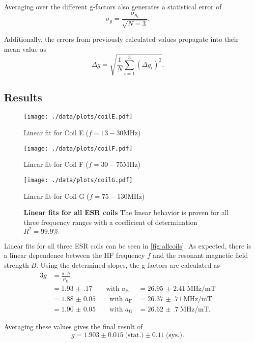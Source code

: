 Averaging over the different g-factors also generates a statistical error of
\begin{equation*}
	\sigma_g = \frac{\sigma_{g_i}}{\sqrt{N=3}}.
\end{equation*}

Additionally, the errors from previously calculated values propagate into their mean value as
\begin{equation*}
	\Delta g = \sqrt{\frac{1}{N}\sum_{i=1}^3 \left(\Delta g_i\right)^2}.
\end{equation*}

\subsection{Results}
\begin{figure}[!htb]
		\texttt{[image: ./data/plots/coilE.pdf]}
		\caption*{Linear fit for Coil E ($f=13-30\si{\MHz}$)}\label{fig:coilE}
	\endminipage\hfill
	\texttt{[image: ./data/plots/coilF.pdf]}
	\caption*{Linear fit for Coil F ($f=30-75\si{\MHz}$)}\label{fig:coilF}
	\endminipage\hfill\centering
	\texttt{[image: ./data/plots/coilG.pdf]}
	\caption*{Linear fit for Coil G ($f=75-130\si{\MHz}$)}\label{fig:coilG}
	\endminipage
	\caption[Linear fits for all ESR coils]{\textbf{Linear fits for all ESR coils} The linear behavior is proven for all three frequency ranges with a coefficient of determination $R^2=\num{99.9}\%$}
	\label{fig:allcoils}
\end{figure}

Linear fits for all three ESR coils can be seen in \autoref{fig:allcoils}.
As expected, there is a linear dependence between the HF frequency $f$ and the resonant magnetic field strength $B$.
Using the determined slopes, the g-factors are calculated as
\begin{alignat*}{3}
	g &= \frac{a\cdot h}{\mu_\text{B}} \\
	&= \num{1.93(17)}\qquad\text{with } a_\text{E}&=\SI{26.95(241)}{\MHz\per\milli\tesla} \\
	&= \num{1.88(5)}\qquad\text{with } a_\text{F}&=\SI{26.37(71)}{\MHz\per\milli\tesla} \\
	&= \num{1.90(5)}\qquad\text{with } a_\text{G}&=\SI{26.62(70)}{\MHz\per\milli\tesla}.
\end{alignat*}

Averaging these values gives the final result of
\begin{equation*}
	g = \num{1.903}\pm\num{0.015}\ \text{(stat.)}\pm\num{0.11}\ \text{(sys.)}.
\end{equation*}

